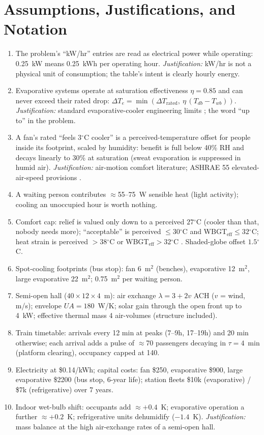 \documentclass[11pt]{article}
\newcommand{\degrees}{\ensuremath{^\circ}}
\begin{document}
\section{Assumptions, Justifications, and Notation}
\begin{enumerate}[label=\textbf{A\arabic*.}]
\item The problem's ``kW/hr'' entries are read as electrical power while operating: 0.25~kW means 0.25~kWh per operating hour. \textit{Justification:} kW/hr is not a physical unit of consumption; the table's intent is clearly hourly energy.
\item Evaporative systems operate at saturation effectiveness $\eta=0.85$ and can never exceed their rated drop: $\Delta T_e=\min(\Delta T_{\text{rated}},\ \eta\,(T_{db}-T_{wb}))$. \textit{Justification:} standard evaporative-cooler engineering limits \cite{ashrae}; the word ``up to'' in the problem.
\item A fan's rated ``feels $3\degrees$C cooler'' is a perceived-temperature offset for people inside its footprint, scaled by humidity: benefit is full below 40\% RH and decays linearly to 30\% at saturation (sweat evaporation is suppressed in humid air). \textit{Justification:} air-motion comfort literature; ASHRAE 55 elevated-air-speed provisions \cite{ashrae55}.
\item A waiting person contributes $\approx$55--75~W sensible heat (light activity); cooling an unoccupied hour is worth nothing.
\item Comfort cap: relief is valued only down to a perceived $27\degrees$C (cooler than that, nobody needs more); ``acceptable'' is perceived $\leq 30\degrees$C and WBGT$_{\text{eff}}\leq32\degrees$C; heat strain is perceived $>38\degrees$C or WBGT$_{\text{eff}}>32\degrees$C \cite{acgih,sherwood,epa}. Shaded-globe offset $1.5\degrees$C.
\item Spot-cooling footprints (bus stop): fan 6~m$^2$ (benches), evaporative 12~m$^2$, large evaporative 22~m$^2$; 0.75~m$^2$ per waiting person.
\item Semi-open hall ($40\times12\times4$~m): air exchange $\lambda = 3 + 2v$ ACH ($v$ = wind, m/s); envelope $UA=180$~W/K; solar gain through the open front up to 4~kW; effective thermal mass 4 air-volumes (structure included).
\item Train timetable: arrivals every 12 min at peaks (7--9h, 17--19h) and 20 min otherwise; each arrival adds a pulse of $\approx$70 passengers decaying in $\tau=4$~min (platform clearing), occupancy capped at 140.
\item Electricity at \$0.14/kWh; capital costs: fan \$250, evaporative \$900, large evaporative \$2200 (bus stop, 6-year life); station fleets \$10k (evaporative) / \$7k (refrigerative) over 7 years.
\item Indoor wet-bulb shift: occupants add $\approx+0.4$~K; evaporative operation a further $\approx+0.2$~K; refrigerative units dehumidify ($-1.4$~K). \textit{Justification:} mass balance at the high air-exchange rates of a semi-open hall.
\end{enumerate}
\end{document}
